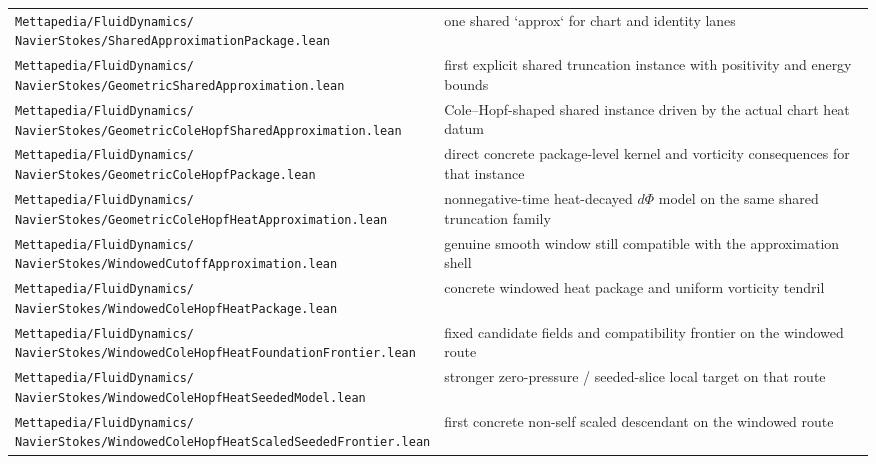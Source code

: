 \documentclass[11pt]{article}
\theoremstyle{remark}
\begin{document}
\begin{center}
\begin{tabular}{p{}p{}}
\shortstack[l]{\texttt{Mettapedia/FluidDynamics/}\\\texttt{NavierStokes/SharedApproximationPackage.lean}} & one shared `approx` for chart and identity lanes \\
\shortstack[l]{\texttt{Mettapedia/FluidDynamics/}\\\texttt{NavierStokes/GeometricSharedApproximation.lean}} & first explicit shared truncation instance with positivity and energy bounds \\
\shortstack[l]{\texttt{Mettapedia/FluidDynamics/}\\\texttt{NavierStokes/GeometricColeHopfSharedApproximation.lean}} & Cole--Hopf-shaped shared instance driven by the actual chart heat datum \\
\shortstack[l]{\texttt{Mettapedia/FluidDynamics/}\\\texttt{NavierStokes/GeometricColeHopfPackage.lean}} & direct concrete package-level kernel and vorticity consequences for that instance \\
\shortstack[l]{\texttt{Mettapedia/FluidDynamics/}\\\texttt{NavierStokes/GeometricColeHopfHeatApproximation.lean}} & nonnegative-time heat-decayed \(d\Phi\) model on the same shared truncation family \\
\shortstack[l]{\texttt{Mettapedia/FluidDynamics/}\\\texttt{NavierStokes/WindowedCutoffApproximation.lean}} & genuine smooth window still compatible with the approximation shell \\
\shortstack[l]{\texttt{Mettapedia/FluidDynamics/}\\\texttt{NavierStokes/WindowedColeHopfHeatPackage.lean}} & concrete windowed heat package and uniform vorticity tendril \\
\shortstack[l]{\texttt{Mettapedia/FluidDynamics/}\\\texttt{NavierStokes/WindowedColeHopfHeatFoundationFrontier.lean}} & fixed candidate fields and compatibility frontier on the windowed route \\
\shortstack[l]{\texttt{Mettapedia/FluidDynamics/}\\\texttt{NavierStokes/WindowedColeHopfHeatSeededModel.lean}} & stronger zero-pressure / seeded-slice local target on that route \\
\shortstack[l]{\texttt{Mettapedia/FluidDynamics/}\\\texttt{NavierStokes/WindowedColeHopfHeatScaledSeededFrontier.lean}} & first concrete non-self scaled descendant on the windowed route \\

\end{tabular}
\end{center}
\end{document}
